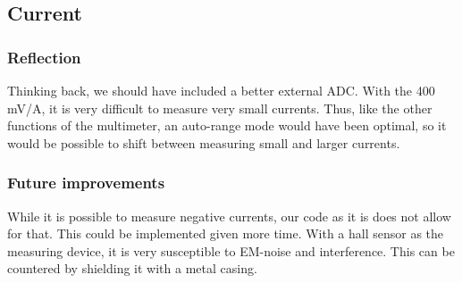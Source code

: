 \subsection{Current}
\label{sec:discussion_current}

\subsubsection{Reflection}
Thinking back, we should have included a better external ADC. With the 400 mV/A, it is very difficult to measure very small currents. Thus, like the other functions of the multimeter, an auto-range mode would have been optimal, so it would be possible to shift between measuring small and larger currents.
\subsubsection{Future improvements}
While it is possible to measure negative currents, our code as it is does not allow for that. This could be implemented given more time. 
With a hall sensor as the measuring device, it is very susceptible to EM-noise and interference. This can be countered by shielding it with a metal casing.